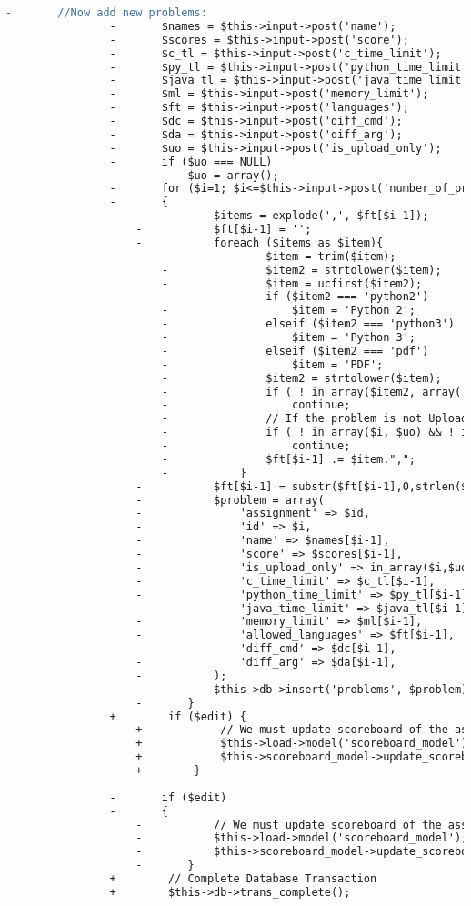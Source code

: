 \begin{lstlisting}[language=diff, caption=Perubahan pada kode Assignment\_model.php]
				-		//Now add new problems:
				-		$names = $this->input->post('name');
				-		$scores = $this->input->post('score');
				-		$c_tl = $this->input->post('c_time_limit');
				-		$py_tl = $this->input->post('python_time_limit');
				-		$java_tl = $this->input->post('java_time_limit');
				-		$ml = $this->input->post('memory_limit');
				-		$ft = $this->input->post('languages');
				-		$dc = $this->input->post('diff_cmd');
				-		$da = $this->input->post('diff_arg');
				-		$uo = $this->input->post('is_upload_only');
				-		if ($uo === NULL)
				-			$uo = array();
				-		for ($i=1; $i<=$this->input->post('number_of_problems'); $i++)
				-		{
					-			$items = explode(',', $ft[$i-1]);
					-			$ft[$i-1] = '';
					-			foreach ($items as $item){
						-				$item = trim($item);
						-				$item2 = strtolower($item);
						-				$item = ucfirst($item2);
						-				if ($item2 === 'python2')
						-					$item = 'Python 2';
						-				elseif ($item2 === 'python3')
						-					$item = 'Python 3';
						-				elseif ($item2 === 'pdf')
						-					$item = 'PDF';
						-				$item2 = strtolower($item);
						-				if ( ! in_array($item2, array('c','c++','python 2','python 3','java','zip','pdf','txt')))
						-					continue;
						-				// If the problem is not Upload-Only, its language should be one of {C,C++,Python 2, Python 3,Java}
						-				if ( ! in_array($i, $uo) && ! in_array($item2, array('c','c++','python 2','python 3','java')) )
						-					continue;
						-				$ft[$i-1] .= $item.",";
						-			}
					-			$ft[$i-1] = substr($ft[$i-1],0,strlen($ft[$i-1])-1); // remove last ','
					-			$problem = array(
					-				'assignment' => $id,
					-				'id' => $i,
					-				'name' => $names[$i-1],
					-				'score' => $scores[$i-1],
					-				'is_upload_only' => in_array($i,$uo)?1:0,
					-				'c_time_limit' => $c_tl[$i-1],
					-				'python_time_limit' => $py_tl[$i-1],
					-				'java_time_limit' => $java_tl[$i-1],
					-				'memory_limit' => $ml[$i-1],
					-				'allowed_languages' => $ft[$i-1],
					-				'diff_cmd' => $dc[$i-1],
					-				'diff_arg' => $da[$i-1],
					-			);
					-			$this->db->insert('problems', $problem);
					-		}
				+        if ($edit) {
					+            // We must update scoreboard of the assignment
					+            $this->load->model('scoreboard_model');
					+            $this->scoreboard_model->update_scoreboard($id);
					+        }
				
				-		if ($edit)
				-		{
					-			// We must update scoreboard of the assignment
					-			$this->load->model('scoreboard_model');
					-			$this->scoreboard_model->update_scoreboard($id);
					-		}
				+        // Complete Database Transaction
				+        $this->db->trans_complete();
				

\end{lstlisting}
